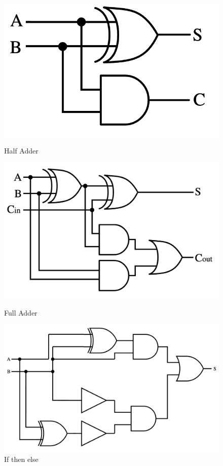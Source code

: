 \documentclass[12pt]{article}
\begin{document}
\begin{figure}[!htb]
    \begin{center}
        \begin{minipage}{0.4\textwidth}
            \centering
            \includegraphics[width=.7\linewidth]{../src/images/Half_adder.png}
            \caption{Half Adder}\label{half}
        \end{minipage}
        \hfill
        \begin{minipage}{0.4\textwidth}
            \centering
            \includegraphics[width=.8\linewidth]{../src/images/Full-adder.png}
            \caption{Full Adder}\label{full}
        \end{minipage}
        \hfill
        \begin{minipage}{0.45\textwidth}
            \centering
            \includegraphics[width=1\linewidth]{../src/images/overflow.png}
            \caption{If then else}\label{overflow}
        \end{minipage}
    \end{center}
\end{figure}
\end{document}
